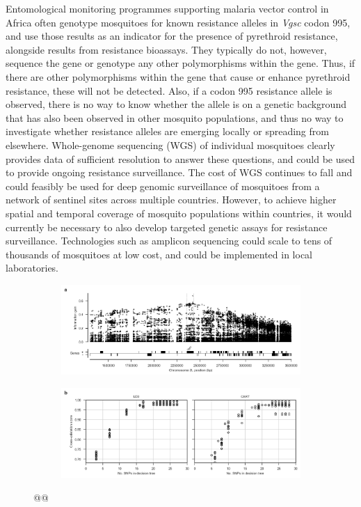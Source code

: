 \documentclass[a4paper,11pt,abstracton,hidelinks]{scrartcl}
\begin{document}
Entomological monitoring programmes supporting malaria vector control in Africa often genotype mosquitoes for known resistance alleles in \textit{Vgsc} codon 995, and use those results as an indicator for the presence of pyrethroid resistance, alongside results from resistance bioassays.
%
They typically do not, however, sequence the gene or genotype any other polymorphisms within the gene.
%
Thus, if there are other polymorphisms within the gene that cause or enhance pyrethroid resistance, these will not be detected.
%
Also, if a codon 995 resistance allele is observed, there is no way to know whether the allele is on a genetic background that has also been observed in other mosquito populations, and thus no way to investigate whether resistance alleles are emerging locally or spreading from elsewhere.
%
Whole-genome sequencing (WGS) of individual mosquitoes clearly provides data of sufficient resolution to answer these questions, and could be used to provide ongoing resistance surveillance.
%
The cost of WGS continues to fall and could feasibly be used for deep genomic surveillance of mosquitoes from a network of sentinel sites across multiple countries.
%
However, to achieve higher spatial and temporal coverage of mosquito populations within countries, it would currently be necessary to also develop targeted genetic assays for resistance surveillance.
%
Technologies such as amplicon sequencing could scale to tens of thousands of mosquitoes at low cost, and could be implemented in local laboratories.


\begin{figure}[t!]
\centering
\begin{subfigure}[t]{1\textwidth}
\includegraphics[width=1\linewidth,center]{artwork/chapter6/info_gain.png}
\end{subfigure}
\begin{subfigure}[t]{1\textwidth}
\includegraphics[width=1\linewidth,center]{artwork/chapter6/tree_cv.png}
\end{subfigure}
\caption{@@
}
\label{fig:dt}
\end{figure}
\end{document}
